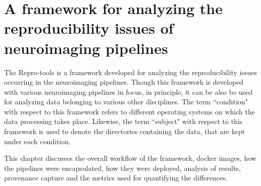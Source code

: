 \chapter{A framework for analyzing the reproducibility issues of neuroimaging pipelines}\label{framework}
The Repro-tools is a framework developed for analyzing the reproducibility issues occurring in the neuroimaging pipelines. Though this framework is developed with various neuroimaging pipelines in focus, in principle, it can be also be used for analyzing data belonging to various other disciplines. The term ``condition" with respect to this framework refers to different operating systems on which the data processing takes place. Likewise, the term ``subject" with respect to this framework is used to denote the directories containing the data, that are kept under each condition. 

This chapter discusses the overall workflow of the framework, docker images, how the pipelines were encapsulated, how they were deployed, analysis of results, provenance capture and the metrics used for quantifying the differences.




